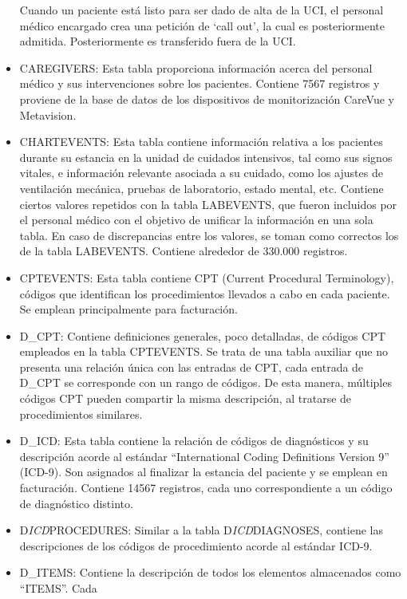 \documentclass{report}
\begin{document}
\begin{itemize}
  Cuando un paciente está listo para ser dado de alta de la UCI, el
  personal médico encargado crea una petición de `call out', la cual es
  posteriormente admitida. Posteriormente es transferido fuera de la
  UCI.
\item
  CAREGIVERS: Esta tabla proporciona información acerca del personal
  médico y sus intervenciones sobre los pacientes. Contiene 7567
  registros y proviene de la base de datos de los dispositivos de
  monitorización CareVue y Metavision. 
\item
  CHARTEVENTS: Esta tabla contiene información relativa a los pacientes
  durante su estancia en la unidad de cuidados intensivos, tal como sus
  signos vitales, e información relevante asociada a su cuidado, como
  los ajustes de ventilación mecánica, pruebas de laboratorio, estado
  mental, etc. Contiene ciertos valores repetidos con la tabla
  LABEVENTS, que fueron incluidos por el personal médico con el objetivo
  de unificar la información en una sola tabla. En caso de discrepancias
  entre los valores, se toman como correctos los de la tabla LABEVENTS.
  Contiene alrededor de 330.000 registros.
\item
  CPTEVENTS: Esta tabla contiene CPT (Current Procedural Terminology),
  códigos que identifican los procedimientos llevados a cabo en cada
  paciente. Se emplean principalmente para facturación. 
\item
 D\_CPT: Contiene definiciones generales, poco detalladas, de
  códigos CPT empleados en la tabla CPTEVENTS. Se trata de una tabla
  auxiliar que no presenta una relación única con las entradas de CPT,
  cada entrada de D\_CPT se corresponde con un rango de códigos. De esta
  manera, múltiples códigos CPT pueden compartir la misma descripción,
  al tratarse de procedimientos similares. 
\item
  D\_ICD: Esta tabla contiene la relación de códigos de diagnósticos y
  su descripción acorde al estándar ``International Coding Definitions
  Version 9'' (ICD-9). Son asignados al finalizar la estancia del
  paciente y se emplean en facturación. Contiene 14567 registros, cada
  uno correspondiente a un código de diagnóstico distinto.
\item
  D\emph{ICD}PROCEDURES: Similar a la tabla D\emph{ICD}DIAGNOSES,
  contiene las descripciones de los códigos de procedimiento acorde al
  estándar ICD-9.
\item
  D\_ITEMS: Contiene la descripción de todos los elementos almacenados
  como ``ITEMS''. Cada


\end{itemize}
\end{document}
